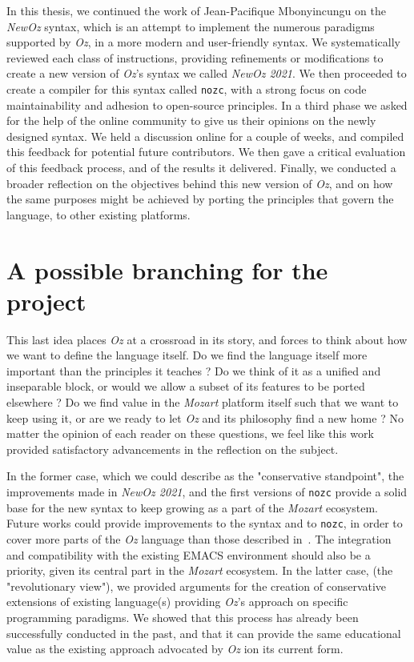 In this thesis, we continued the work of Jean-Pacifique Mbonyincungu on the \textit{NewOz} syntax, which is an attempt to implement the numerous paradigms supported by \textit{Oz}, in a more modern and user-friendly syntax.
We systematically reviewed each class of instructions, providing refinements or modifications to create a new version of \textit{Oz}'s syntax we called \textit{NewOz 2021}.
We then proceeded to create a compiler for this syntax called \texttt{nozc}, with a strong focus on code maintainability and adhesion to open-source principles.
In a third phase we asked for the help of the online community to give us their opinions on the newly designed syntax.
We held a discussion online for a couple of weeks, and compiled this feedback for potential future contributors.
We then gave a critical evaluation of this feedback process, and of the results it delivered.
Finally, we conducted a broader reflection on the objectives behind this new version of \textit{Oz}, and on how the same purposes might be achieved by porting the principles that govern the language, to other existing platforms.\newline

\section{A possible branching for the project}\label{sec:ch5-a-possible-branching-for-the-project}
This last idea places \textit{Oz} at a crossroad in its story, and forces to think about how we want to define the language itself.
Do we find the language itself more important than the principles it teaches ?
Do we think of it as a unified and inseparable block, or would we allow a subset of its features to be ported elsewhere ?
Do we find value in the \textit{Mozart} platform itself such that we want to keep using it, or are we ready to let \textit{Oz} and its philosophy find a new home ?
No matter the opinion of each reader on these questions, we feel like this work provided satisfactory advancements in the reflection on the subject.\newline

In the former case, which we could describe as the "conservative standpoint", the improvements made in \textit{NewOz 2021}, and the first versions of \texttt{nozc} provide a solid base for the new syntax to keep growing as a part of the \textit{Mozart} ecosystem.
Future works could provide improvements to the syntax and to \texttt{nozc}, in order to cover more parts of the \textit{Oz} language than those described in~\cite{van2004concepts}.
The integration and compatibility with the existing EMACS environment should also be a priority, given its central part in the \textit{Mozart} ecosystem.\newline
In the latter case, (the "revolutionary view"), we provided arguments for the creation of conservative extensions of existing language(s) providing \textit{Oz}'s approach on specific programming paradigms.
We showed that this process has already been successfully conducted in the past, and that it can provide the same educational value as the existing approach advocated by \textit{Oz} ion its current form.

